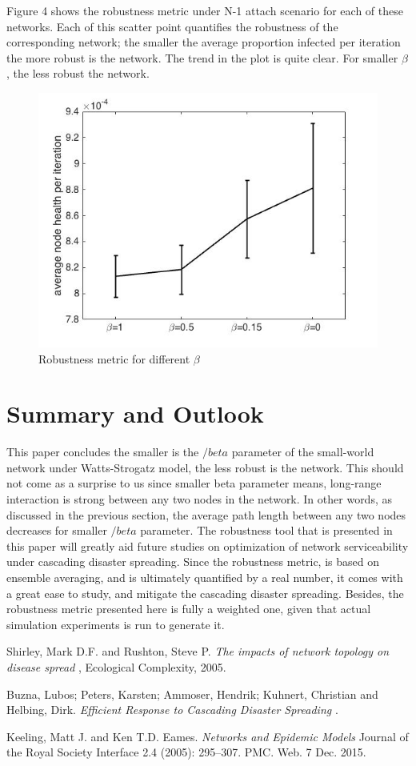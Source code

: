 \documentclass[11pt]{article}
\begin{document}
Figure 4 shows the robustness metric under N-1 attach scenario for each of these networks. Each of this scatter point quantifies the robustness of the corresponding network; the smaller the average proportion infected per iteration the more robust is the network. The trend in the plot is quite clear. For smaller $\beta$, the less robust the network. 

\begin{figure}[t!]
\centering
\includegraphics[width=0.70\columnwidth]{images/periteration.jpg}
\caption{Robustness metric for different $\beta$}
\end{figure}
\clearpage

\section{Summary and Outlook}
This paper concludes the smaller is the $/beta$ parameter of the small-world network under Watts-Strogatz model, the less robust is the network. This should not come as a surprise to us since smaller beta parameter means, long-range interaction is strong between any two nodes in the network. In other words, as discussed in the previous section, the average path length between any two nodes decreases for smaller $/beta$ parameter. The robustness tool that is presented in this paper will greatly aid future studies on optimization of network serviceability under cascading disaster spreading. Since the robustness metric, is based on ensemble averaging, and is ultimately quantified by a real number, it comes with a great ease to study, and mitigate the cascading disaster spreading. Besides, the robustness metric presented here is fully a weighted one, given that actual simulation experiments is run to generate it. 



\newpage
\begin{thebibliography}{9}
 Shirley, Mark D.F. and Rushton, Steve P. \textit{ The impacts of network topology on disease spread }, Ecological Complexity, 2005.

 Buzna, Lubos; Peters, Karsten; Ammoser, Hendrik;  Kuhnert, Christian and Helbing, Dirk.\textit{ Efficient Response to Cascading Disaster Spreading } .

Keeling, Matt J. and Ken T.D. Eames. \textit{ Networks and Epidemic Models } Journal of the Royal Society Interface 2.4 (2005): 295–307. PMC. Web. 7 Dec. 2015.

\end{thebibliography}
\end{document}
